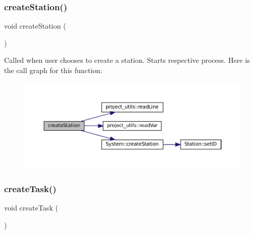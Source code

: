\subsubsection{\texorpdfstring{create\+Station()}{createStation()}}
{\footnotesize\ttfamily void create\+Station (\begin{DoxyParamCaption}{ }\end{DoxyParamCaption})}

Called when user chooses to create a station. Starts respective process. Here is the call graph for this function\+:
\nopagebreak
\begin{figure}[H]
\begin{center}
\leavevmode
\includegraphics[width=350pt]{Train-System_8cpp_a06aa6dbae847b41673895645c4c4585a_cgraph}
\end{center}
\end{figure}
\mbox{\label{Train-System_8cpp_ac6b62651f3428a773cc4b856d382d4ba}} 
\subsubsection{\texorpdfstring{create\+Task()}{createTask()}}
{\footnotesize\ttfamily void create\+Task (\begin{DoxyParamCaption}{ }\end{DoxyParamCaption})}

